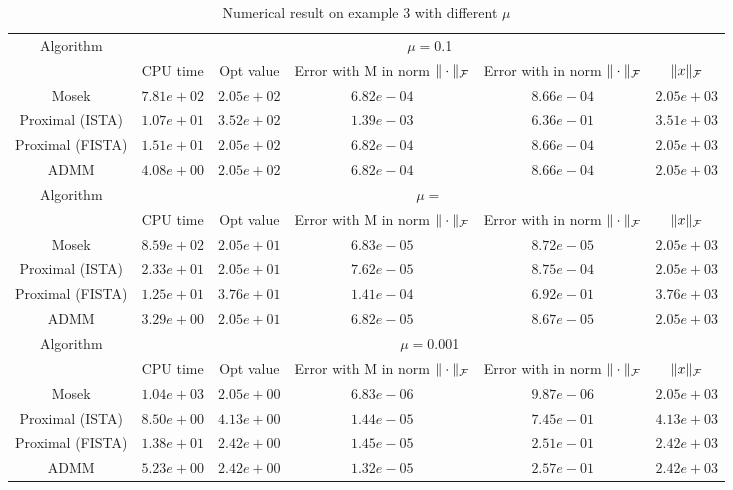 \documentclass{article}
\begin{document}
	\begin{table}
		\centering
		\begin{tabular}{|c|c|c|c|c|c|}
		
		\hline
		\multirow{2}{*}{ Algorithm} &\multicolumn{5}{c|}{$\mu=$0.1}\\\cline{2-6}
		 &CPU time &Opt value &Error with M in norm $\|\cdot\|_\mathcal F$ &Error with in norm $\|\cdot\|_\mathcal F$ &$\|x\|_\mathcal F$\\\hline
		Mosek & $7.81e+02$ & $2.05e+02$ & $6.82e-04$ & $8.66e-04$ & $2.05e+03$\\\hline
		Proximal (ISTA) & $1.07e+01$ & $3.52e+02$ & $1.39e-03$ & $6.36e-01$ & $3.51e+03$\\\hline
		Proximal (FISTA) & $1.51e+01$ & $2.05e+02$ & $6.82e-04$ & $8.66e-04$ & $2.05e+03$\\\hline
		ADMM & $4.08e+00$ & $2.05e+02$ & $6.82e-04$ & $8.66e-04$ & $2.05e+03$\\\hline
		\multirow{2}{*}{ Algorithm} &\multicolumn{5}{c|}{$\mu=$}\\\cline{2-6}
 &CPU time &Opt value &Error with M in norm $\|\cdot\|_\mathcal F$ &Error with in norm $\|\cdot\|_\mathcal F$ &$\|x\|_\mathcal F$\\\hline
		Mosek & $8.59e+02$ & $2.05e+01$ & $6.83e-05$ & $8.72e-05$ & $2.05e+03$\\\hline
Proximal (ISTA) & $2.33e+01$ & $2.05e+01$ & $7.62e-05$ & $8.75e-04$ & $2.05e+03$\\\hline
Proximal (FISTA) & $1.25e+01$ & $3.76e+01$ & $1.41e-04$ & $6.92e-01$ & $3.76e+03$\\\hline
ADMM & $3.29e+00$ & $2.05e+01$ & $6.82e-05$ & $8.67e-05$ & $2.05e+03$\\\hline
\multirow{2}{*}{ Algorithm} &\multicolumn{5}{c|}{$\mu=$0.001}\\\cline{2-6}
 &CPU time &Opt value &Error with M in norm $\|\cdot\|_\mathcal F$ &Error with in norm $\|\cdot\|_\mathcal F$ &$\|x\|_\mathcal F$\\\hline
Mosek & $1.04e+03$ & $2.05e+00$ & $6.83e-06$ & $9.87e-06$ & $2.05e+03$\\\hline
Proximal (ISTA) & $8.50e+00$ & $4.13e+00$ & $1.44e-05$ & $7.45e-01$ & $4.13e+03$\\\hline
Proximal (FISTA) & $1.38e+01$ & $2.42e+00$ & $1.45e-05$ & $2.51e-01$ & $2.42e+03$\\\hline
ADMM & $5.23e+00$ & $2.42e+00$ & $1.32e-05$ & $2.57e-01$ & $2.42e+03$\\\hline
		\end{tabular}
		\caption{Numerical result on example 3 with different $\mu$\label{example3}}
		\end{table}
		
\end{document}
